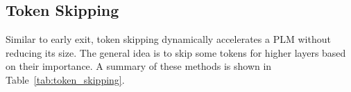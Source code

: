 \documentclass[letterpaper]{article} %
\begin{document}
\begin{table}[t]
    \vspace*{0.1cm}
    \centering
    \caption{A summary of token skipping methods. This table is adapted from \citet{transkimmer}.}
    \label{tab:token_skipping}
\end{table}

\subsection{Token Skipping}
Similar to early exit, token skipping dynamically accelerates a PLM without reducing its size. The general idea is to skip some tokens for higher layers based on their importance. A summary of these methods is shown in Table~\ref{tab:token_skipping}.
\end{document}
